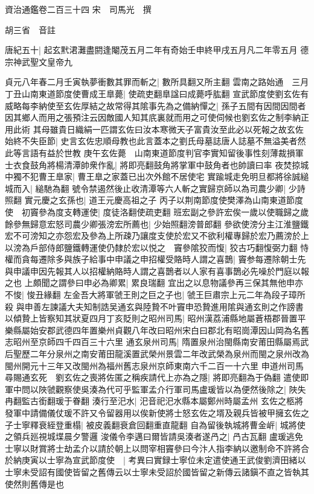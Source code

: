 資治通鑑卷二百三十四
宋　司馬光　撰

胡三省　音註

唐紀五十|{
	起玄黓涒灘盡閼逢閹茂五月二年有奇始壬申終甲戌五月凡二年零五月}
德宗神武聖文皇帝九

貞元八年春二月壬寅執夢衝數其罪而斬之|{
	數所具翻又所主翻}
雲南之路始通　三月丁丑山南東道節度使曹成王臯薨|{
	使疏吏翻臯諡曰成薨呼肱翻}
宣武節度使劉玄佐有威略每李納使至玄佐厚結之故常得其隂事先為之備納憚之|{
	孫子五間有因間因間者因其鄉人而用之張預注云因敵國人知其㡳裏就而用之可使伺候也劉玄佐之制李納正用此術}
其母雖貴日織絹一匹謂玄佐曰汝本寒微天子富貴汝至此必以死報之故玄佐始終不失臣節|{
	史言玄佐忠順母教也此言蓋本之劉氏母墓誌唐人誌墓不無溢美者然此等言語有益於世教}
庚午玄佐薨　山南東道節度判官李實知留後事性刻薄裁損軍士衣食鼓角將楊清潭帥衆作亂|{
	將即亮翻鼓角將掌軍中鼓角者也帥讀曰率}
夜焚掠城中獨不犯曹王臯家|{
	曹王臯之家蓋已出次外館不居使宅}
實踰城走免明旦都將徐誠縋城而入|{
	縋馳為翻}
號令禁遏然後止收清潭等六人斬之實歸京師以為司農少卿|{
	少詩照翻}
實元慶之玄孫也|{
	道王元慶高祖之子}
丙子以荆南節度使樊澤為山南東道節度使　初竇參為度支轉運使|{
	度徒洛翻使疏吏翻}
班宏副之參許宏俟一歲以使職歸之歲餘參無歸意宏怒司農少卿張滂宏所薦也|{
	少始照翻滂普郎翻}
參欲使滂分主江淮鹽鐵宏不可滂知之亦怨宏及參為上所疎乃讓度支使於宏又不欲利權專歸於宏乃薦滂於上以滂為戶部侍郎鹽鐵轉運使仍隸於宏以悦之　竇參隂狡而愎|{
	狡古巧翻愎弼力翻}
恃權而貪每遷除多與族子給事中申議之申招權受賂時人謂之喜鵲|{
	竇参每遷除朝士先與申議申因先報其人以招權納賂時人謂之喜鵲者以人家有喜事鵲必先噪於門庭以報之也}
上頗聞之謂參曰申必為卿累|{
	累良瑞翻}
宜出之以息物議參再三保其無他申亦不悛|{
	悛丑緣翻}
左金吾大將軍虢王則之巨之子也|{
	虢王巨肅宗上元二年為段子璋所殺}
與申善左諫議大夫知制誥吴通玄與陸贄不叶竇申恐贄進用隂與通玄則之作謗書以傾贄上皆察知其狀夏四月丁亥貶則之昭州司馬|{
	昭州漢荔浦縣地屬蒼梧郡晉置平樂縣屬始安郡武德四年置樂州貞觀八年改曰昭州宋白曰郡北有昭崗潭因山岡為名舊志昭州至京師四千四百三十六里}
通玄泉州司馬|{
	隋置泉州治閩縣南安莆田縣屬焉武后聖歷二年分泉州之南安莆田龍溪置武榮州景雲二年改武榮為泉州而閩之泉州改為閩州開元十三年又改閩州為福州舊志泉州京師東南六千二百一十六里}
申道州司馬尋賜通玄死　劉玄佐之喪將佐匿之稱疾請代上亦為之隱|{
	將即亮翻為于偽翻}
遣使即軍中問以陜虢觀察使吳湊為代可乎監軍孟介行軍司馬盧瑗皆以為便然後除之|{
	陜失冉翻監古銜翻瑗于眷翻}
湊行至汜水|{
	汜音祀汜水縣本屬鄭州時屬孟州}
玄佐之柩將發軍中請備儀仗瑗不許又令留器用以俟新使將士怒玄佐之壻及親兵皆被甲擁玄佐之子士寧釋衰絰登重榻|{
	被皮義翻衰倉回翻重直龍翻}
自為留後執城將曹金㟁|{
	城將使之領兵廵視城堞晨夕警邏}
浚儀令李邁曰爾皆請吳湊者遂冎之|{
	冎古瓦翻}
盧瑗逃免士寧以財賞將士劫孟介以請於朝上以問宰相竇參曰今汴人指李納以邀制命不許將合於納庚寅以士寧為宣武節度使　|{
	考異曰實録士寧位未定遣使通王武俊劉濟田緒以士寧未受詔有國使皆留之舊傳云以士寧未受詔於國皆留之新傳云諸鎭不直之皆執其使然則舊傳是也}
